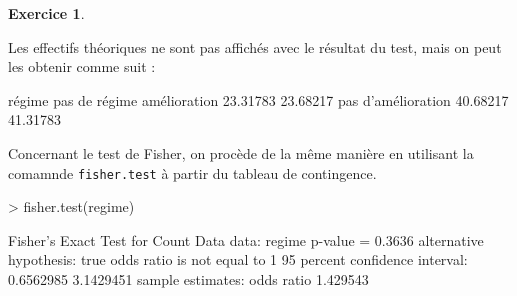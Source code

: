 \documentclass[11pt]{report}
\theoremstyle{definition}
\newtheorem{exo}{Exercice}[chapter]
\begin{document}
\begin{exo}
\begin{sol}
Les effectifs théoriques ne sont pas affichés avec le résultat du test, mais
on peut les obtenir comme suit :
\begin{Schunk}
\begin{Soutput}
                     régime pas de régime
amélioration       23.31783      23.68217
pas d'amélioration 40.68217      41.31783
\end{Soutput}
\end{Schunk}

Concernant le test de Fisher, on procède de la même manière en utilisant la
comamnde \texttt{fisher.test} à partir du tableau de contingence.
\begin{Schunk}
\begin{Sinput}
> fisher.test(regime)
\end{Sinput}
\begin{Soutput}
	Fisher's Exact Test for Count Data
data:  regime 
p-value = 0.3636
alternative hypothesis: true odds ratio is not equal to 1 
95 percent confidence interval:
 0.6562985 3.1429451 
sample estimates:
odds ratio 
  1.429543 
\end{Soutput}
\end{Schunk}
\end{sol}
\end{exo}
%
%
\end{document}
